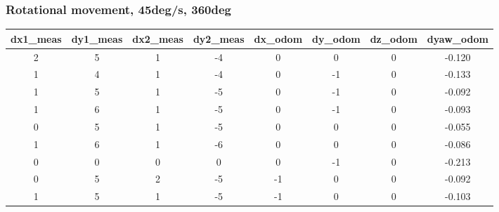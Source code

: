 \documentclass[a4paper, 12pt]{article}
\begin{document}
    \subsubsection{Rotational movement, 45deg/s, 360deg}

    \begin{table}[H]
    \scriptsize
    \begin{tabular}{@{}cccccccc@{}}
    \toprule
    \textbf{dx1\_meas} & \textbf{dy1\_meas} & \textbf{dx2\_meas} & \textbf{dy2\_meas} & \textbf{dx\_odom} & \textbf{dy\_odom} & \textbf{dz\_odom} & \textbf{dyaw\_odom} \\ \midrule
    2                      & 5                      & 1                      & -4                     & 0                 & 0                 & 0                 & -0.120              \\
    1                      & 4                      & 1                      & -4                     & 0                 & -1                & 0                 & -0.133              \\
    1                      & 5                      & 1                      & -5                     & 0                 & -1                & 0                 & -0.092              \\
    1                      & 6                      & 1                      & -5                     & 0                 & -1                & 0                 & -0.093              \\
    0                      & 5                      & 1                      & -5                     & 0                 & 0                 & 0                 & -0.055              \\
    1                      & 6                      & 1                      & -6                     & 0                 & 0                 & 0                 & -0.086              \\
    0                      & 0                      & 0                      & 0                      & 0                 & -1                & 0                 & -0.213              \\
    0                      & 5                      & 2                      & -5                     & -1                & 0                 & 0                 & -0.092              \\
    1                      & 5                      & 1                      & -5                     & -1                & 0                 & 0                 & -0.103              \\

\end{tabular}
\end{table}
\end{document}
